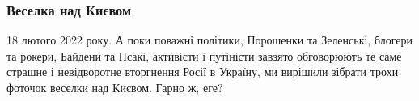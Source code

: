  
 
 
 
 
\clearpage
\subsubsection{Веселка над Києвом}

18 лютого 2022 року. А поки поважні політики, Порошенки та Зеленські, блогери
та рокери, Байдени та Псакі, активісти і путіністи завзято обговорюють те саме
страшне і невідворотне вторгнення Росії в Україну, ми вирішили зібрати трохи
фоточок веселки над Києвом. Гарно ж, еге?








